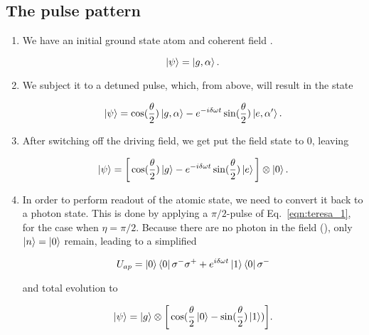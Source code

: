 	\subsection{The pulse pattern}
	\begin{enumerate}
		\item We have an initial ground state atom  and coherent field \iket{\alpha}. 
		
		\begin{equation}\label{key}
			\ket{\psi} = \Ket{g,\alpha}.
		\end{equation}
		
		\item We subject it to a detuned pulse, which, from above, will result in the state
		
		\begin{equation}\label{key}
			\ket{\psi} = \cos(\frac{\theta}{2})\Ket{g,\alpha} - e^{-i\delta\omega t}\sin(\frac{\theta}{2})\Ket{e,\alpha'}.
		\end{equation}
		
		\item After switching off the driving field, we get put the field state to 0, leaving
		
		\begin{equation}\label{eqn:teresa_3}
			\ket{\psi} = \bigg[\cos(\frac{\theta}{2})\Ket{g} - e^{-i\delta\omega t}\sin(\frac{\theta}{2})\Ket{e}\bigg]\otimes \Ket{0}.
		\end{equation}
		
		\noindent {}
		
		\item In order to perform readout of the atomic state, we need to convert it back to a photon state. This is done by applying a $ \pi/2 $-pulse of Eq.~\eqref{eqn:teresa_1}, for the case when $ \eta = \pi/2 $. Because there are no photon in the field (), only $ \Ket{n} = \Ket{0} $ remain, leading to a simplified
		
		\begin{equation}\label{key}
			U_{ap} = \ket{0}\bra{0}\sigma^{-}\sigma^{+} + e^{i\delta\omega t}\ket{1}\bra{0}\sigma^{-}
		\end{equation}
		
		\noindent and total evolution to
		
		\begin{equation}\label{eqn:teresa_2}
			\ket{\psi} = \ket{g}\otimes\bigg[\cos(\frac{\theta}{2}\ket{0} - \sin(\frac{\theta}{2})\ket{1})\bigg].
		\end{equation}
		

\end{enumerate}
